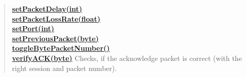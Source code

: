 {{{{{\begin{verse}
\hyperlink{filetransferUDP.FileTransfer.setPacketDelay(int)}{{\bf setPacketDelay(int)}} \\
\hyperlink{filetransferUDP.FileTransfer.setPacketLossRate(float)}{{\bf setPacketLossRate(float)}} \\
\hyperlink{filetransferUDP.FileTransfer.setPort(int)}{{\bf setPort(int)}} \\
\hyperlink{filetransferUDP.FileTransfer.setPreviousPacket(byte[])}{{\bf setPreviousPacket(byte\lbrack \rbrack )}} \\
\hyperlink{filetransferUDP.FileTransfer.toggleBytePacketNumber()}{{\bf toggleBytePacketNumber()}} \\
\hyperlink{filetransferUDP.FileTransfer.verifyACK(byte[])}{{\bf verifyACK(byte\lbrack \rbrack )}} Checks, if the acknowledge packet is correct (with the right session and packet number).\\
\end{verse}
}
}}}}
